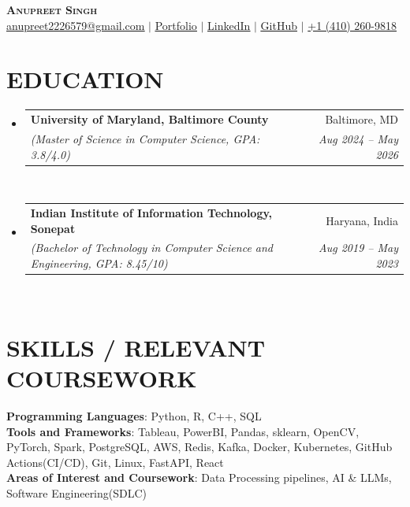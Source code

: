\documentclass[letterpaper,11pt]{article}
\makeatletter
\newcommand{\SectionListBegin}{\begin{itemize}[leftmargin=0.15in, label={}]}
\newcommand{\SectionListEnd}{\end{itemize}}
\newcommand{\DLSubheadingItem}[4]{
  \vspace{-2pt}\item
    \begin{tabular*}{0.97\textwidth}[t]{l@{\extracolsep{\fill}}r}
      \textbf{#1} & {\small #2} \\
      \textit{\small#3} & \textit{\small #4} \\
    \end{tabular*}\vspace{-7pt}
}
\newcommand{\swallow}[1]{}
\makeatother
\begin{document}
\begin{center}
	{\textbf{\Huge \scshape Anupreet Singh}} \\ \vspace{1pt}
	\small  \href{mailto:anupreet2226579@gmail.com}{\underline{anupreet2226579@gmail.com}} 
	  $|$ 
	\small {\href{https://portfolio-omega-three-hw8q4rw3hx.vercel.app}{\underline{Portfolio}}}
    $|$ 
	\small {\href{https://www.linkedin.com/in/anupreet-singh-71b1861b8/}{\underline{LinkedIn}}}
    $|$ 
	\small {\href{https://github.com/anupreetsingh}{\underline{GitHub}}}
    $|$ 
{\underline{+1 (410) 260-9818}} 
\end{center}


\section{EDUCATION}
  \SectionListBegin
    \DLSubheadingItem
      {University of Maryland, Baltimore County}{Baltimore, MD}
      {(Master of Science in Computer Science, GPA: 3.8/4.0)}{Aug 2024 -- May 2026}\\
    {\vspace{2mm}}
    \DLSubheadingItem
      {Indian Institute of Information Technology, Sonepat}{Haryana, India}
      {(Bachelor of Technology in Computer Science and Engineering, GPA: 8.45/10)}{Aug 2019 -- May 2023} \\
  \SectionListEnd
  

\section{SKILLS / RELEVANT COURSEWORK}
  \SectionListBegin
    \small{\item{
    \vspace{1mm}
     \textbf{Programming Languages}{: Python, R, C++, SQL} \\
     \vspace{1mm}
     \textbf{Tools and Frameworks}{: Tableau, PowerBI, Pandas, sklearn, OpenCV, PyTorch, Spark, PostgreSQL, AWS, Redis, Kafka, Docker, Kubernetes, GitHub Actions(CI/CD), Git, Linux, FastAPI, React \swallow{LangChain, Kafka, Pinecone} }\\
     \vspace{1mm}
     \textbf{Areas of Interest and Coursework}{: Data Processing pipelines,  AI \& LLMs, Software Engineering(SDLC)} \\
     \vspace{1mm}
    }}
  \SectionListEnd
\end{document}
